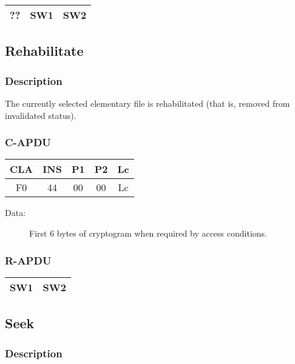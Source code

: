 \documentclass[a4paper,oneside]{article}
\begin{document}
\begin{tabular}{|c|c|c|} \hline
?? & SW1 & SW2 \\ \hline
\end{tabular}


\subsection{Rehabilitate}

\subsubsection*{Description}

The currently selected elementary file is rehabilitated (that is,
removed from invalidated status).

\subsubsection*{C-APDU}

\begin{tabular}{|c|c|c|c|c|} \hline
CLA & INS & P1 & P2 & Lc \\ \hline \hline
F0 & 44 & 00 & 00 & Lc \\ \hline
\end{tabular}

\begin{description}
\item[Data:] First 6 bytes of cryptogram when required by access conditions.
\end{description}

\subsubsection*{R-APDU}

\begin{tabular}{|c|c|} \hline
SW1 & SW2 \\ \hline
\end{tabular}


\subsection{Seek}

\subsubsection*{Description}
\end{document}
